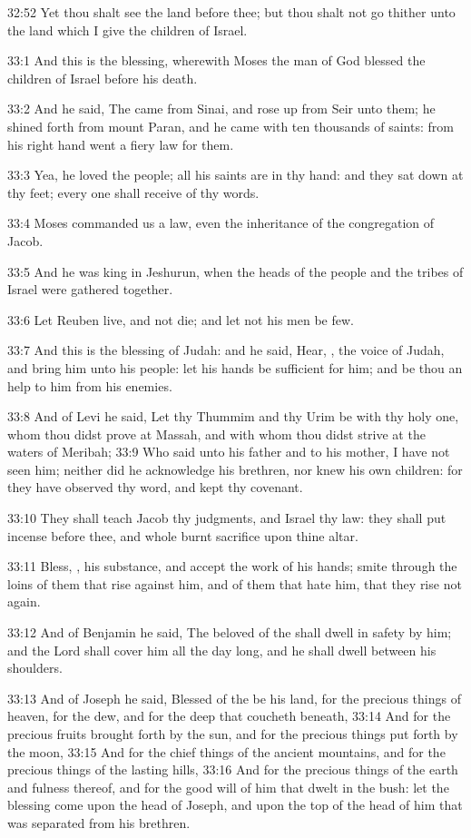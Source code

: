 32:52 Yet thou shalt see the land before thee; but thou shalt not go thither unto the land which I give the children of Israel.

33:1 And this is the blessing, wherewith Moses the man of God blessed the children of Israel before his death.

33:2 And he said, The \LORD came from Sinai, and rose up from Seir unto them; he shined forth from mount Paran, and he came with ten thousands of saints: from his right hand went a fiery law for them.

33:3 Yea, he loved the people; all his saints are in thy hand: and they sat down at thy feet; every one shall receive of thy words.

33:4 Moses commanded us a law, even the inheritance of the congregation of Jacob.

33:5 And he was king in Jeshurun, when the heads of the people and the tribes of Israel were gathered together.

33:6 Let Reuben live, and not die; and let not his men be few.

33:7 And this is the blessing of Judah: and he said, Hear, \LORD, the voice of Judah, and bring him unto his people: let his hands be sufficient for him; and be thou an help to him from his enemies.

33:8 And of Levi he said, Let thy Thummim and thy Urim be with thy holy one, whom thou didst prove at Massah, and with whom thou didst strive at the waters of Meribah; 33:9 Who said unto his father and to his mother, I have not seen him; neither did he acknowledge his brethren, nor knew his own children: for they have observed thy word, and kept thy covenant.

33:10 They shall teach Jacob thy judgments, and Israel thy law: they shall put incense before thee, and whole burnt sacrifice upon thine altar.

33:11 Bless, \LORD, his substance, and accept the work of his hands; smite through the loins of them that rise against him, and of them that hate him, that they rise not again.

33:12 And of Benjamin he said, The beloved of the \LORD shall dwell in safety by him; and the Lord shall cover him all the day long, and he shall dwell between his shoulders.

33:13 And of Joseph he said, Blessed of the \LORD be his land, for the precious things of heaven, for the dew, and for the deep that coucheth beneath, 33:14 And for the precious fruits brought forth by the sun, and for the precious things put forth by the moon, 33:15 And for the chief things of the ancient mountains, and for the precious things of the lasting hills, 33:16 And for the precious things of the earth and fulness thereof, and for the good will of him that dwelt in the bush: let the blessing come upon the head of Joseph, and upon the top of the head of him that was separated from his brethren.


